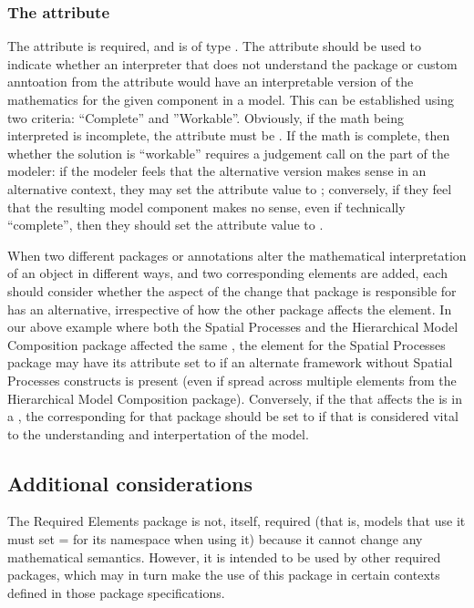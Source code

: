 \subsubsection{The \fixttspace{} attribute}
\label{attribute-viablewithoutchange}

The  attribute is required, and is of type .  The attribute should be used to indicate whether an interpreter that does not understand the package or custom anntoation from the  attribute would have an interpretable version of the mathematics for the given component in a model.  This can be established using two criteria:  ``Complete'' and ''Workable''.  Obviously, if the math being interpreted is incomplete, the  attribute must be .  If the math is complete, then whether the solution is ``workable'' requires a judgement call on the part of the modeler: if the modeler feels that the alternative version makes sense in an alternative context, they may set the attribute value to ; conversely, if they feel that the resulting model component makes no sense, even if technically ``complete'', then they should set the attribute value to .

When two different packages or annotations alter the mathematical interpretation of an \SBase object in different ways, and two corresponding \ChangedMath elements are added, each should consider whether the aspect of the change that package is responsible for has an alternative, irrespective of how the other package affects the element.  In our above example where both the Spatial Processes and the Hierarchical Model Composition package affected the same \Species, the \ChangedMath element for the Spatial Processes package may have its  attribute set to  if an alternate framework without Spatial Processes constructs is present (even if spread across multiple \Submodel elements from the Hierarchical Model Composition package).  Conversely, if the \Reaction that affects the \Species is in a \Submodel, the corresponding  for that package should be set to  if that \Reaction is considered vital to the understanding and interpertation of the model.


\subsection{Additional considerations}

The Required Elements package is not, itself, required (that is, models that use it must set = for its namespace when using it) because it cannot change any mathematical semantics.  However, it is intended to be used by other required packages, which may in turn make the use of this package in certain contexts defined in those package specifications. 
